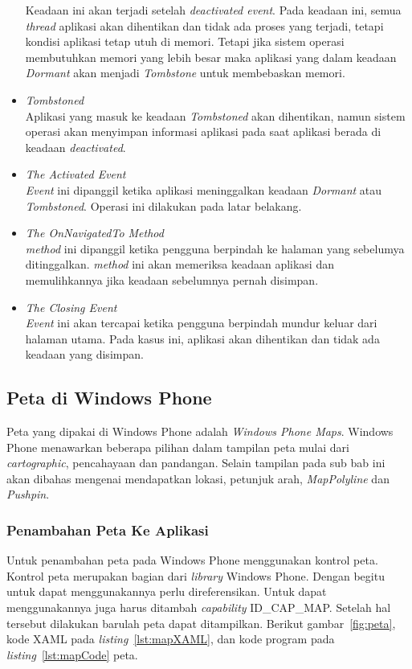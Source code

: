 \begin{itemize}
	Keadaan ini akan terjadi setelah \textit{deactivated event}. Pada keadaan ini, semua \textit{thread} aplikasi akan dihentikan dan tidak ada proses yang terjadi, tetapi kondisi aplikasi tetap utuh di memori. Tetapi jika sistem operasi membutuhkan memori yang lebih besar maka aplikasi yang dalam keadaan \textit{Dormant} akan menjadi \textit{Tombstone} untuk membebaskan memori.
	\item \textit{Tombstoned} \\
	Aplikasi yang masuk ke keadaan \textit{Tombstoned} akan dihentikan, namun sistem operasi akan menyimpan informasi aplikasi pada saat aplikasi berada di keadaan \textit{deactivated}.
	\item \textit{The Activated Event} \\
	\textit{Event} ini dipanggil ketika aplikasi meninggalkan keadaan \textit{Dormant} atau \textit{Tombstoned}. Operasi ini dilakukan pada latar belakang. 
	\item \textit{The OnNavigatedTo Method} \\
	\textit{method} ini dipanggil ketika pengguna berpindah ke halaman yang sebelumya ditinggalkan. \textit{method} ini akan memeriksa keadaan aplikasi dan memulihkannya jika keadaan sebelumnya pernah disimpan. 
	\item \textit{The Closing Event} \\
	\textit{Event} ini akan tercapai ketika pengguna berpindah mundur keluar dari halaman utama. Pada kasus ini, aplikasi akan dihentikan dan tidak ada keadaan yang disimpan. 
\end{itemize}

\subsection{Peta di Windows Phone}
\label{subsec:Peta di Windows Phone}
\hspace{0.5cm} Peta yang dipakai di Windows Phone adalah \textit{Windows Phone Maps}. Windows Phone menawarkan beberapa pilihan dalam tampilan peta mulai dari \textit{cartographic}, pencahayaan dan pandangan. Selain tampilan pada sub bab ini akan dibahas mengenai mendapatkan lokasi, petunjuk arah, \textit{MapPolyline} dan \textit{Pushpin}\cite{MSDN}.

\subsubsection{Penambahan Peta Ke Aplikasi}
\label{subsubsec:Penambahan Peta Ke Aplikasi}
\hspace{0.5cm} Untuk penambahan peta pada Windows Phone menggunakan kontrol peta. Kontrol peta merupakan bagian dari \textit{library} Windows Phone. Dengan begitu untuk dapat menggunakannya perlu direferensikan. Untuk dapat menggunakannya juga harus ditambah \textit{capability} ID\_CAP\_MAP. Setelah hal tersebut dilakukan barulah peta dapat ditampilkan. Berikut gambar~\ref{fig:peta}, kode XAML pada \textit{listing}~\ref{lst:mapXAML}, dan kode program pada \textit{listing}~\ref{lst:mapCode} peta.

